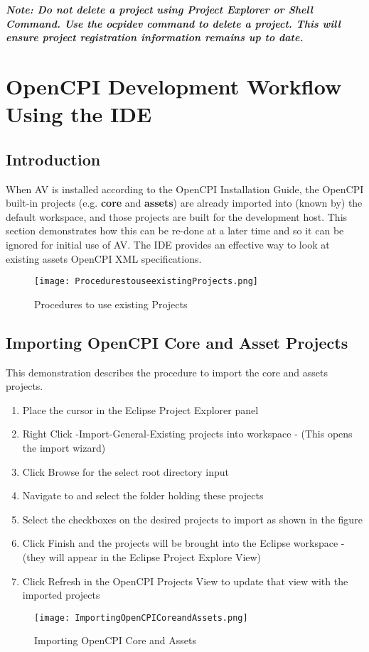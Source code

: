 \textbf{\emph{Note: Do not delete a project using Project Explorer or Shell Command. Use the ocpidev command to delete a project. This will ensure project registration information remains up to date.}}
\section{OpenCPI Development Workflow Using the IDE}
\subsection{Introduction}
When AV is installed according to the OpenCPI Installation Guide, the OpenCPI built-in projects (e.g. \textbf{core} and \textbf{assets}) are already imported into (known by) the default workspace, and those projects are built for the development host.  This section demonstrates how this can be re-done at a later time and so it can be ignored for initial use of AV.  The IDE provides an effective way to look at existing assets OpenCPI XML specifications.
\begin{figure}[h!]
	\centering
	\caption{Procedures to use existing Projects}\label{fig:Procedures to use existing Projects}
	\texttt{[image: ProcedurestouseexistingProjects.png]}
 \end{figure}
\subsection{Importing OpenCPI Core and Asset Projects}
This demonstration describes the procedure to import the core and assets projects.
\begin {enumerate}
\item	Place the cursor in the Eclipse Project Explorer panel
\item	Right Click -Import-General-Existing projects into workspace - (This opens the import wizard)
\item	Click Browse for the select root directory input
\item	Navigate to and select the folder holding these projects
\item	Select the checkboxes on the desired projects to import as shown in the figure
\item	Click Finish and the projects will be brought into the Eclipse workspace - (they will appear in the Eclipse Project Explore View)
\item	Click Refresh in the OpenCPI Projects View to update that view with the imported projects
\end{enumerate}
\begin{figure}[h!]
	\centering
	\caption{Importing OpenCPI Core and Assets}\label{fig:Importing OpenCPI Core and Assets}
	\texttt{[image: ImportingOpenCPICoreandAssets.png]}
 \end{figure}
